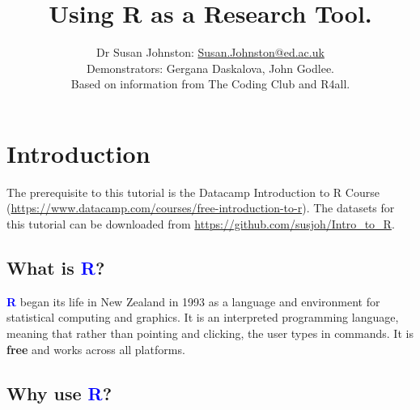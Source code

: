 \documentclass[a4paper,12pt]{article}
\newcommand\boldblue[1]{\textcolor{blue}{\textbf{#1}}}
\begin{document}





\title{Using R as a Research Tool.}
\author{\small{Dr Susan Johnston: \href{mailto:Susan.Johnston@ed.ac.uk}{Susan.Johnston@ed.ac.uk}}  \\
        \small{Demonstrators: Gergana Daskalova, John Godlee.} \\
        \small{Based on information from The Coding Club and R4all.}}
\date{}








\maketitle



\section {Introduction}

The prerequisite to this tutorial is the Datacamp Introduction to R Course (\url{https://www.datacamp.com/courses/free-introduction-to-r}). The datasets for this tutorial can be downloaded from \url{https://github.com/susjoh/Intro_to_R}.

\subsection {What is \boldblue{R}?}

\boldblue{R} began its life in New Zealand in 1993 as a language and environment for statistical computing and graphics. It is an interpreted programming language, meaning that rather than pointing and clicking, the user types in commands. It is \textbf{free} and works across all platforms.


\subsection {Why use \boldblue{R}?}
\end{document}
